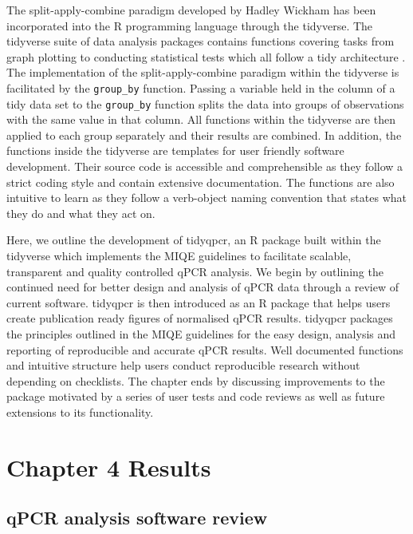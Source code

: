 \documentclass[../main.tex]{subfiles}
\begin{document}
The split-apply-combine paradigm developed by Hadley Wickham has been incorporated into the R programming language through the tidyverse.
The tidyverse suite of data analysis packages contains functions covering tasks from graph plotting to conducting statistical tests which all follow a tidy architecture \parencite{Wickham2014}. 
The implementation of the split-apply-combine paradigm within the tidyverse is facilitated by the \lstinline{group_by} function.
Passing a variable held in the column of a tidy data set to the \lstinline{group_by} function splits the data into groups of observations with the same value in that column.
All functions within the tidyverse are then applied to each group separately and their results are combined. 
In addition, the functions inside the tidyverse are templates for user friendly software development.
Their source code is accessible and comprehensible as they follow a strict coding style and contain extensive documentation.
The functions are also intuitive to learn as they follow a verb-object naming convention that states what they do and what they act on.


Here, we outline the development of tidyqpcr, an R package built within the tidyverse which implements the MIQE guidelines to facilitate scalable, transparent and quality controlled qPCR analysis.
We begin by outlining the continued need for better design and analysis of qPCR data through a review of current software.
tidyqpcr is then introduced as an R package that helps users create publication ready figures of normalised qPCR results. 
tidyqpcr packages the principles outlined in the MIQE guidelines for the easy design, analysis and reporting of reproducible and accurate qPCR results.
Well documented functions and intuitive structure help users conduct reproducible research without depending on checklists.
The chapter ends by discussing improvements to the package motivated by a series of user tests and code reviews as well as future extensions to its functionality.

\section{Chapter 4 Results}

\subsection{qPCR analysis software review}
\end{document}
